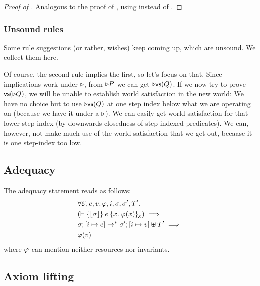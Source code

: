 \begin{proof}[Proof of ]
Analogous to the proof of , using  instead of .
\end{proof}

\subsubsection{Unsound rules}

Some rule suggestions (or rather, wishes) keep coming up, which are unsound. We collect them here.

Of course, the second rule implies the first, so let's focus on that.
Since implications work under $\mathord{\triangleright}$, from $\mathord{\triangleright} P$ we can get $\mathord{\triangleright} \textsf{vs}({Q})$.
If we now try to prove $\textsf{vs}({\mathord{\triangleright} Q})$, we will be unable to establish world satisfaction in the new world:
We have no choice but to use $\mathord{\triangleright} \textsf{vs}({Q})$ at one step index below what we are operating on (because we have it under a $\mathord{\triangleright}$).
We can easily get world satisfaction for that lower step-index (by downwards-closedness of step-indexed predicates).
We can, however, not make much use of the world satisfaction that we get out, becaase it is one step-index too low.

\subsection{Adequacy}

The adequacy statement reads as follows:
\begin{align*}
 &\All \mask, \expr, \val, \pred, i, \state, \state', \tpool'.
 \\&( \proves \hoare{\ownPhys\state}{\expr}{x.\; \pred(x)}[\mask]) \implies
 \\&\cfg{\state}{[i \mapsto \expr]} \step^\ast
     \cfg{\state'}{[i \mapsto \val] \uplus \tpool'} \implies
     \\&\pred(\val)
\end{align*}
where $\varphi$ can mention neither resources nor invariants.

\subsection{Axiom lifting}\label{sec:lifting}


